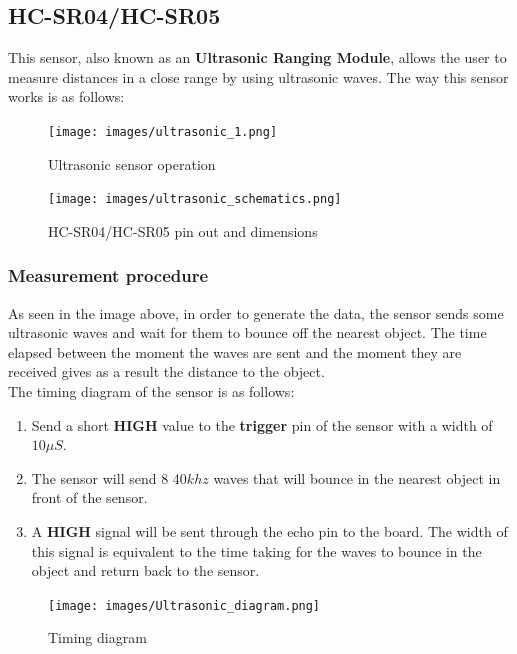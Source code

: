 \documentclass[14pt]{article}
\begin{document}
		\subsection{HC-SR04/HC-SR05}
			\begin{normalsize}
				This sensor, also known as an \textbf{Ultrasonic Ranging Module}, allows the user to measure distances in a close range by using ultrasonic waves. The way this sensor works is as follows:
				\begin{figure}[h]
					\centering
					\texttt{[image: images/ultrasonic\_1.png]}
					\caption{Ultrasonic sensor operation}
					\label{Ultrasonic_Operation}
				\end{figure}
				\begin{figure}[h]
					\centering
					\texttt{[image: images/ultrasonic\_schematics.png]}
					\caption{HC-SR04/HC-SR05 pin out and dimensions}
				\end{figure}
				\subsubsection{Measurement procedure}{\label{HC-SR05_proc}}
					As seen in the image above, in order to generate the data, the sensor sends some ultrasonic waves and wait for them to bounce off the nearest object. The time elapsed between the moment the waves are sent and the moment they are received gives as a result the distance to the object.\\
					
					The timing diagram of the sensor is as follows:
					\begin{enumerate}
						\item Send a short \textbf{HIGH} value to the \textbf{trigger} pin of the sensor with a width of $10 \mu S$.
						\item The sensor will send 8 40$khz$ waves that will bounce in the nearest object in front of the sensor.
						\item A \textbf{HIGH} signal will be sent through the echo pin to the board. The width of this signal is equivalent to the time taking for the waves to bounce in the object and return back to the sensor.
					\end{enumerate}
					\begin{figure}[h]
						\centering
						\texttt{[image: images/Ultrasonic\_diagram.png]}
						\caption{Timing diagram}
						\label{HC-SR04/HC-SR05_timing}
					\end{figure}
					

\end{normalsize}
\end{document}
